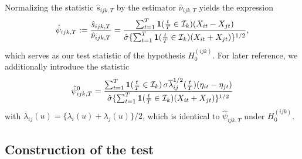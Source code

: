\documentclass[a4paper,12pt]{article}
\numberwithin{equation}{section}
\begin{document}
Normalizing the statistic $\hat{s}_{ijk,T}$ by the estimator $\hat{\nu}_{ijk,T}$ yields the expression 
\begin{equation}\label{eq:stat}
\hat{\psi}_{ijk,T} := \frac{\hat{s}_{ijk,T}}{\hat{\nu}_{ijk,T}} = \frac{\sum\nolimits_{t=1}^T \boldsymbol{1}(\frac{t}{T} \in \mathcal{I}_k) (X_{it} - X_{jt})}{ \hat{\sigma} \{ \sum\nolimits_{t=1}^T \boldsymbol{1}(\frac{t}{T} \in \mathcal{I}_k) (X_{it} + X_{jt}) \}^{1/2}}, 
\end{equation}
which serves as our test statistic of the hypothesis $H_0^{(ijk)}$. For later reference, we additionally introduce the statistic 
\begin{equation}\label{eq:stat0}
\hat{\psi}_{ijk,T}^0 = \frac{\sum\nolimits_{t=1}^T \boldsymbol{1}(\frac{t}{T} \in \mathcal{I}_k) \, \sigma \overline{\lambda}_{ij}^{1/2}(\frac{t}{T}) (\eta_{it} - \eta_{jt})}{ \hat{\sigma} \{ \sum\nolimits_{t=1}^T \boldsymbol{1}(\frac{t}{T} \in \mathcal{I}_k) (X_{it} + X_{jt}) \}^{1/2}}
\end{equation}
with $\overline{\lambda}_{ij}(u) = \{ \lambda_i(u) + \lambda_j(u) \}/2$, which is identical to $\hat{\psi}_{ijk,T}$ under $H_0^{(ijk)}$. 


\subsection{Construction of the test} 
\end{document}
